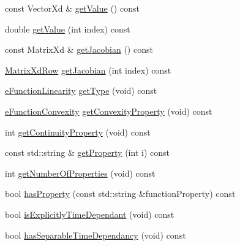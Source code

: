 \begin{DoxyCompactItemize}
\item 
const Vector\+Xd \& \hyperlink{structocra_1_1FunctionInterfaceMapping_3_01X_3_01Function_01_4_01_4_a84abef36d73b69156ad0a6c537c12241}{get\+Value} () const 
\item 
double \hyperlink{structocra_1_1FunctionInterfaceMapping_3_01X_3_01Function_01_4_01_4_a3608689a6956db9277e20b501d7967da}{get\+Value} (int index) const 
\item 
const Matrix\+Xd \& \hyperlink{structocra_1_1FunctionInterfaceMapping_3_01X_3_01Function_01_4_01_4_a9ac7e4b2681377a64ecaec8c3ea03b50}{get\+Jacobian} () const 
\item 
\hyperlink{namespaceocra_a608bf0522317ed1df3bbfc6a5753bc01}{Matrix\+Xd\+Row} \hyperlink{structocra_1_1FunctionInterfaceMapping_3_01X_3_01Function_01_4_01_4_a34f94b4383d88c63f914eeda1679c505}{get\+Jacobian} (int index) const 
\item 
\hyperlink{namespaceocra_a87b525b5508b0f6e9d931f14c7c226ab}{e\+Function\+Linearity} \hyperlink{structocra_1_1FunctionInterfaceMapping_3_01X_3_01Function_01_4_01_4_a4b8acb545a001c669123333d3b37dd89}{get\+Type} (void) const 
\item 
\hyperlink{namespaceocra_ae6e8dca6121e9618486a449754876119}{e\+Function\+Convexity} \hyperlink{structocra_1_1FunctionInterfaceMapping_3_01X_3_01Function_01_4_01_4_af6b5162a8a991d57cd8716116b2b3a88}{get\+Convexity\+Property} (void) const 
\item 
int \hyperlink{structocra_1_1FunctionInterfaceMapping_3_01X_3_01Function_01_4_01_4_ac7da0801abdc191086cba57d6ac1e9b6}{get\+Continuity\+Property} (void) const 
\item 
const std\+::string \& \hyperlink{structocra_1_1FunctionInterfaceMapping_3_01X_3_01Function_01_4_01_4_a85f22051e54eb957c64689cf206cef04}{get\+Property} (int i) const 
\item 
int \hyperlink{structocra_1_1FunctionInterfaceMapping_3_01X_3_01Function_01_4_01_4_ad7d01797762bfbf2d77b92c0c354029d}{get\+Number\+Of\+Properties} (void) const 
\item 
bool \hyperlink{structocra_1_1FunctionInterfaceMapping_3_01X_3_01Function_01_4_01_4_af1032e8f411f360ec5b55dfd0769afe1}{has\+Property} (const std\+::string \&function\+Property) const 
\item 
bool \hyperlink{structocra_1_1FunctionInterfaceMapping_3_01X_3_01Function_01_4_01_4_a56cbba4d942380328373bad3b0d27cff}{is\+Explicitly\+Time\+Dependant} (void) const 
\item 
bool \hyperlink{structocra_1_1FunctionInterfaceMapping_3_01X_3_01Function_01_4_01_4_add53c771152787622feb73da624bcaf7}{has\+Separable\+Time\+Dependancy} (void) const 
\end{DoxyCompactItemize}


